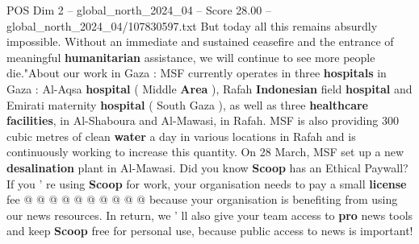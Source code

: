 \begin{textsample}{POS Dim 2 – global\_north\_2024\_04 – Score 28.00 – global\_north\_2024\_04/107830597.txt}
But today all this remains absurdly impossible.
Without an immediate and sustained ceasefire and the entrance of meaningful \textbf{humanitarian} assistance, we will continue to see more people die."About our work in Gaza : MSF currently operates in three \textbf{hospitals} in Gaza : Al-Aqsa \textbf{hospital} ( Middle \textbf{Area} ), Rafah \textbf{Indonesian} field \textbf{hospital} and Emirati maternity \textbf{hospital} ( South Gaza ), as well as three \textbf{healthcare} \textbf{facilities}, in Al-Shaboura and Al-Mawasi, in Rafah.
MSF is also providing 300 cubic metres of clean \textbf{water} a day in various locations in Rafah and is continuously working to increase this quantity.
On 28 March, MSF set up a new \textbf{desalination} plant in Al-Mawasi.
Did you know \textbf{Scoop} has an Ethical Paywall?
If you ' re using \textbf{Scoop} for work, your organisation needs to pay a small \textbf{license} fee @ @ @ @ @ @ @ @ @ @ because your organisation is benefiting from using our news resources.
In return, we ' ll also give your team access to \textbf{pro} news tools and keep \textbf{Scoop} free for personal use, because public access to news is important!

\end{textsample}

